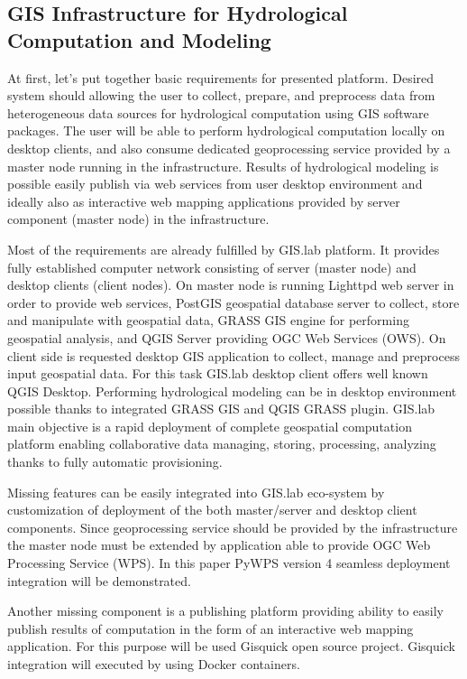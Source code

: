 \documentclass{isprs}
\begin{document}
\subsection{GIS Infrastructure for Hydrological Computation and
  Modeling}\label{GIS Infrastructure for Hydrological Computation and
  Modeling}

At first, let's put together basic requirements for presented
platform. Desired system should allowing the user to collect, prepare,
and preprocess data from heterogeneous data sources for hydrological
computation using GIS software packages. The user will be able to
perform hydrological computation locally on desktop clients, and also
consume dedicated geoprocessing service provided by a master node
running in the infrastructure. Results of hydrological modeling is
possible easily publish via web services from user desktop environment
and ideally also as interactive web mapping applications provided by
server component (master node) in the infrastructure.

Most of the requirements are already fulfilled by GIS.lab platform. It
provides fully established computer network consisting of server
(master node) and desktop clients (client nodes). On master node is
running Lighttpd web server in order to provide web services, PostGIS
geospatial database server to collect, store and manipulate with
geospatial data, GRASS GIS engine for performing geospatial analysis,
and QGIS Server providing OGC Web Services (OWS). On client side is
requested desktop GIS application to collect, manage and preprocess
input geospatial data. For this task GIS.lab desktop client offers
well known QGIS Desktop. Performing hydrological modeling can be in
desktop environment possible thanks to integrated GRASS GIS and QGIS
GRASS plugin. GIS.lab main objective is a rapid deployment of complete
geospatial computation platform enabling collaborative data managing,
storing, processing, analyzing thanks to fully automatic provisioning.

Missing features can be easily integrated into GIS.lab eco-system by
customization of deployment of the both master/server and desktop
client components. Since geoprocessing service should be provided by
the infrastructure the master node must be extended by application
able to provide OGC Web Processing Service (WPS). In this paper PyWPS
version 4 seamless deployment integration will be demonstrated.

Another missing component is a publishing platform providing ability
to easily publish results of computation in the form of an interactive
web mapping application. For this purpose will be used Gisquick open
source project. Gisquick integration will executed by using Docker
containers.
\end{document}
